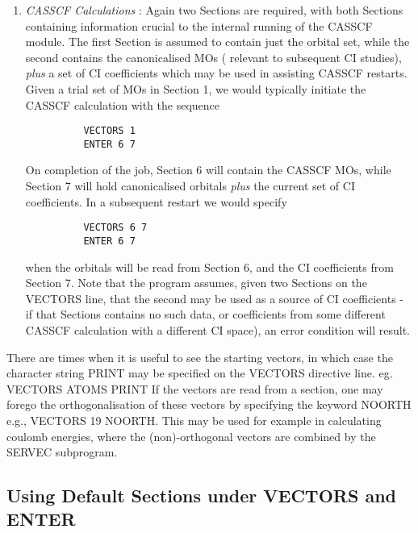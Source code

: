 \documentclass[11pt,fleqn]{article}
\begin{document}
\begin{enumerate}
\item {\em CASSCF Calculations} : Again two Sections are required, with
both Sections containing information crucial to the internal running
of the CASSCF module. The first Section is assumed to contain just the
orbital set, while the second contains the canonicalised MOs ( relevant to
subsequent CI studies), {\em plus}  a set of CI coefficients which may be
used in assisting CASSCF restarts.  Given a trial set of MOs in Section 1,
we would typically initiate the CASSCF calculation with the sequence

{
\footnotesize
\begin{verbatim}
          VECTORS 1
          ENTER 6 7
\end{verbatim}
}

On completion of the job, Section 6 will contain the CASSCF MOs, while
Section 7 will hold canonicalised orbitals {\em plus}  the current set of
CI coefficients. In a subsequent restart we would specify

{
\footnotesize
\begin{verbatim}
          VECTORS 6 7
          ENTER 6 7
\end{verbatim}
}
when the orbitals will be read from Section 6, and the CI coefficients
from Section 7. Note that the program assumes, given two Sections
on the VECTORS line, that the second may be used as a source
of CI coefficients - if that Sections contains no such data, or
coefficients from some different CASSCF calculation with a
different CI space), an error condition will result.
\end{enumerate}

There are times when it is useful to see the starting vectors, in which
case the character string PRINT may be specified on the VECTORS
directive line. eg. VECTORS ATOMS PRINT
If the vectors are read from a section, one may forego the orthogonalisation
of these vectors by specifying the keyword NOORTH e.g., VECTORS 19 NOORTH.
This may be used for example in calculating coulomb energies, where the
(non)-orthogonal vectors are combined by the SERVEC subprogram.

\subsection{Using Default Sections under VECTORS and ENTER}
\end{document}
